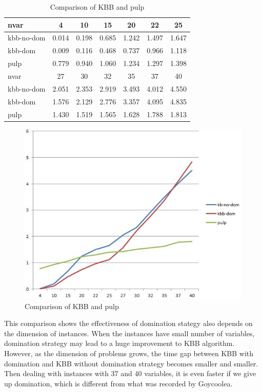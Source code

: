 \documentclass[a4paper,11pt]{article}
\begin{document}
\begin{table}[H]
\begin{center}
\begin{tabular}{l c c c c c c}
\hline
nvar&4&10&15&20&22&25\\
\hline
kbb-no-dom&0.014&0.198&0.685&1.242&1.497 &1.647\\
kbb-dom&0.009&0.116&0.468&0.737&0.966&1.118\\
pulp&0.779&0.940&1.060&1.234&1.297&1.398\\
\hline\hline
nvar&27&30&32&35&37&40\\
\hline
kbb-no-dom&2.051&2.353&2.919&3.493&4.012&4.550\\
kbb-dom&1.576&2.129&2.776&3.357&4.095&4.835\\
pulp&1.430&1.519&1.565&1.628&1.788&1.813\\
\hline
\end{tabular}
\end{center}
\caption{Comparison of KBB and pulp\label{t4}}
\end{table}

\begin{figure}[H]
\begin{center}
\includegraphics[scale=0.6]{2}
\end{center}
\caption{Comparison of KBB and pulp \label{f3}}
\end{figure}

This comparison shows the effectiveness of domination stategy also depends on the dimension of instances. When the instances have small number of variables, domination strategy may lead to a huge improvement to KBB algorithm. However, as the dimension of problems grows, the time gap between KBB with domination and KBB without domination strategy becomes smaller and smaller. Then dealing with instances with 37 and 40 variables, it is even faster if we give up domination, which is different from what was recorded by Goycoolea.
\end{document}
